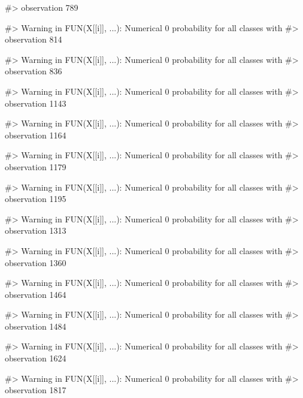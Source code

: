 \begin{Schunk}
\begin{Soutput}
#> observation 789
\end{Soutput}
\begin{Soutput}
#> Warning in FUN(X[[i]], ...): Numerical 0 probability for all classes with
#> observation 814
\end{Soutput}
\begin{Soutput}
#> Warning in FUN(X[[i]], ...): Numerical 0 probability for all classes with
#> observation 836
\end{Soutput}
\begin{Soutput}
#> Warning in FUN(X[[i]], ...): Numerical 0 probability for all classes with
#> observation 1143
\end{Soutput}
\begin{Soutput}
#> Warning in FUN(X[[i]], ...): Numerical 0 probability for all classes with
#> observation 1164
\end{Soutput}
\begin{Soutput}
#> Warning in FUN(X[[i]], ...): Numerical 0 probability for all classes with
#> observation 1179
\end{Soutput}
\begin{Soutput}
#> Warning in FUN(X[[i]], ...): Numerical 0 probability for all classes with
#> observation 1195
\end{Soutput}
\begin{Soutput}
#> Warning in FUN(X[[i]], ...): Numerical 0 probability for all classes with
#> observation 1313
\end{Soutput}
\begin{Soutput}
#> Warning in FUN(X[[i]], ...): Numerical 0 probability for all classes with
#> observation 1360
\end{Soutput}
\begin{Soutput}
#> Warning in FUN(X[[i]], ...): Numerical 0 probability for all classes with
#> observation 1464
\end{Soutput}
\begin{Soutput}
#> Warning in FUN(X[[i]], ...): Numerical 0 probability for all classes with
#> observation 1484
\end{Soutput}
\begin{Soutput}
#> Warning in FUN(X[[i]], ...): Numerical 0 probability for all classes with
#> observation 1624
\end{Soutput}
\begin{Soutput}
#> Warning in FUN(X[[i]], ...): Numerical 0 probability for all classes with
#> observation 1817
\end{Soutput}
\begin{Soutput}

\end{Soutput}
\end{Schunk}
